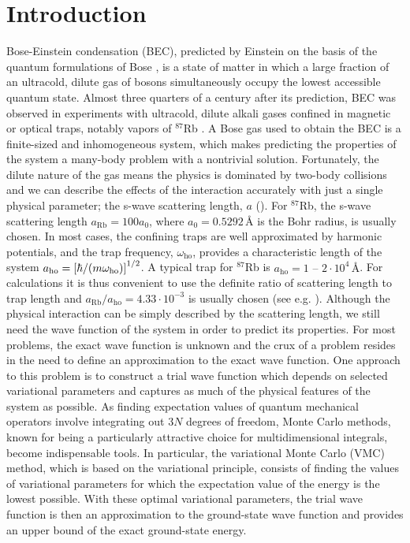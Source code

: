 \section{Introduction}\label{sec:Introduction}

Bose-Einstein condensation (BEC), predicted by Einstein \citeyearpar{BEC1924, BEC1925} on the basis of the quantum formulations of Bose \citeyearpar{Bose1924}, is a state of matter in which a large fraction of an ultracold, dilute gas of bosons simultaneously occupy the lowest accessible quantum state. Almost three quarters of a century after its prediction, BEC was observed in experiments with ultracold, dilute alkali gases confined in magnetic or optical traps, notably vapors of $^{87}$Rb \citep{BEC1995}. A Bose gas used to obtain the BEC is a finite-sized and inhomogeneous system, which makes predicting the properties of the system a many-body problem with a nontrivial solution. Fortunately, the dilute nature of the gas means the physics is dominated by two-body collisions and we can describe the effects of the interaction accurately with just a single physical parameter; the s-wave scattering length, $a$ (\cite{Dalfovo1999}). For $^{87}$Rb, the s-wave scattering length $a_\mathrm{Rb} = 100 a_0$, where $a_0 = 0.5292 \, \text{Å}$ is the Bohr radius, is usually chosen. In most cases, the confining traps are well approximated by harmonic potentials, and the trap frequency, $\omega_\mathrm{ho}$, provides a characteristic length of the system $a_\mathrm{ho} = \qty[\hbar / \qty(m \omega_\mathrm{ho})]^{1/2}$. A typical trap for $^{87}$Rb is $a_\mathrm{ho}=1 \mbox{ -- } 2 \cdot 10^4 \, \text{Å}$. For calculations it is thus convenient to use the definite ratio of scattering length to trap length and $a_\mathrm{Rb} / a_\mathrm{ho} = 4.33 \cdot 10^{-3}$ is usually chosen (see e.g. \cite{DuBois2001}). Although the physical interaction can be simply described by the scattering length, we still need the wave function of the system in order to predict its properties. For most problems, the exact wave function is unknown and the crux of a problem resides in the need to define an approximation to the exact wave function. One approach to this problem is to construct a trial wave function which depends on selected variational parameters and captures as much of the physical features of the system as possible. As finding expectation values of quantum mechanical operators involve integrating out $3N$ degrees of freedom, Monte Carlo methods, known for being a particularly attractive choice for multidimensional integrals, become indispensable tools. In particular, the variational Monte Carlo (VMC) method, which is based on the variational principle, consists of finding the values of variational parameters for which the expectation value of the energy is the lowest possible. With these optimal variational parameters, the trial wave function is then an approximation to the ground-state wave function and provides an upper bound of the exact ground-state energy. 

